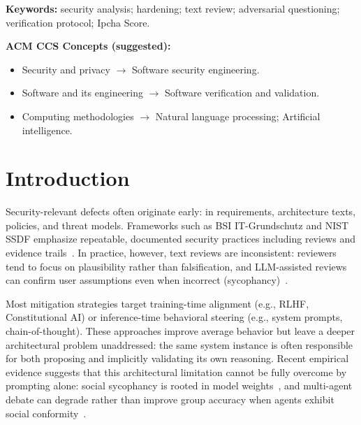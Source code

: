 \documentclass[11pt,a4paper]{article}
\begin{document}
\vspace{0.5em}
\noindent\textbf{Keywords:}
security analysis; hardening; text review; adversarial questioning; verification protocol; Ipcha Score.

\vspace{0.5em}
\noindent\textbf{ACM CCS Concepts (suggested):}
\begin{itemize}
  \item Security and privacy $\rightarrow$ Software security engineering.
  \item Software and its engineering $\rightarrow$ Software verification and validation.
  \item Computing methodologies $\rightarrow$ Natural language processing; Artificial intelligence.
\end{itemize}

\section{Introduction}
Security-relevant defects often originate early: in requirements, architecture texts, policies, and threat models.
Frameworks such as BSI IT-Grundschutz and NIST SSDF emphasize repeatable, documented security practices including reviews and evidence trails~\cite{bsi_standard_100_2,nist_sp800_218}.
In practice, however, text reviews are inconsistent: reviewers tend to focus on plausibility rather than falsification, and LLM-assisted reviews can confirm user assumptions even when incorrect (sycophancy)~\cite{sharma_sycophancy}.

Most mitigation strategies target training-time alignment (e.g., RLHF, Constitutional AI) or inference-time behavioral steering (e.g., system prompts, chain-of-thought).
These approaches improve average behavior but leave a deeper architectural problem unaddressed: the same system instance is often responsible for both proposing and implicitly validating its own reasoning.
Recent empirical evidence suggests that this architectural limitation cannot be fully overcome by prompting alone: social sycophancy is rooted in model weights~\cite{cheng2026}, and multi-agent debate can degrade rather than improve group accuracy when agents exhibit social conformity~\cite{wynn2025}.
\end{document}
